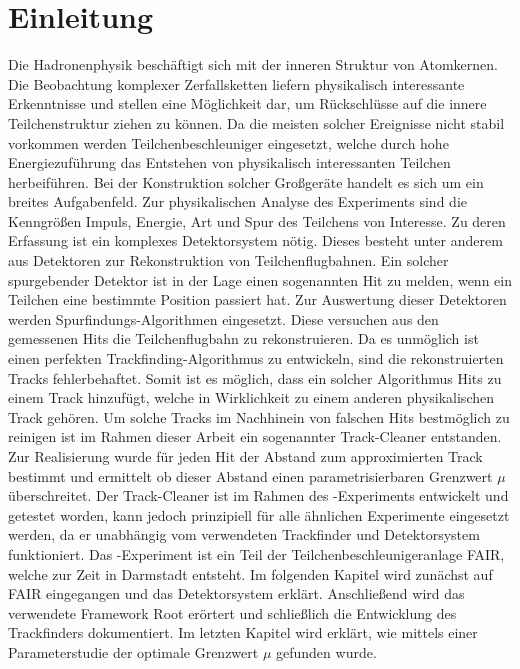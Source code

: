\chapter{Einleitung}
Die Hadronenphysik beschäftigt sich mit der inneren Struktur von Atomkernen. Die Beobachtung komplexer Zerfallsketten liefern physikalisch interessante Erkenntnisse und stellen eine Möglichkeit dar, um Rückschlüsse auf die innere Teilchenstruktur ziehen zu können. Da die meisten solcher Ereignisse nicht stabil vorkommen werden Teilchenbeschleuniger eingesetzt, welche durch hohe Energiezuführung das Entstehen von physikalisch interessanten Teilchen herbeiführen. Bei der Konstruktion solcher Großgeräte handelt es sich um ein breites Aufgabenfeld. Zur physikalischen Analyse des Experiments sind die Kenngrößen Impuls, Energie, Art und Spur des Teilchens von Interesse. Zu deren Erfassung ist ein komplexes Detektorsystem nötig. Dieses besteht unter anderem aus Detektoren zur Rekonstruktion von Teilchenflugbahnen. Ein solcher spurgebender Detektor ist in der Lage einen sogenannten Hit zu melden, wenn ein Teilchen eine bestimmte Position passiert hat. Zur Auswertung dieser Detektoren werden Spurfindungs-Algorithmen eingesetzt. Diese versuchen aus den gemessenen Hits die Teilchenflugbahn zu rekonstruieren. Da es unmöglich ist einen perfekten Trackfinding-Algorithmus zu entwickeln, sind die rekonstruierten Tracks fehlerbehaftet. Somit ist es möglich, dass ein solcher Algorithmus Hits zu einem Track hinzufügt, welche in Wirklichkeit zu einem anderen physikalischen Track gehören. Um solche Tracks im Nachhinein von falschen Hits bestmöglich zu reinigen ist im Rahmen dieser Arbeit ein sogenannter Track-Cleaner entstanden. Zur Realisierung wurde für jeden Hit der Abstand zum approximierten Track bestimmt und ermittelt ob dieser Abstand einen parametrisierbaren Grenzwert $\mu$ überschreitet. Der Track-Cleaner ist im Rahmen des \pnd{}-Experiments entwickelt und getestet worden, kann jedoch prinzipiell für alle ähnlichen Experimente eingesetzt werden, da er unabhängig vom verwendeten Trackfinder und Detektorsystem funktioniert. Das \pnd{}-Experiment ist ein Teil der Teilchenbeschleunigeranlage FAIR, welche zur Zeit in Darmstadt entsteht. Im folgenden Kapitel wird zunächst auf FAIR eingegangen und das Detektorsystem \pnd{} erklärt. Anschließend wird das verwendete Framework Root erörtert und schließlich die Entwicklung des Trackfinders dokumentiert. Im letzten Kapitel wird erklärt, wie mittels einer Parameterstudie der optimale Grenzwert $\mu$ gefunden wurde.
